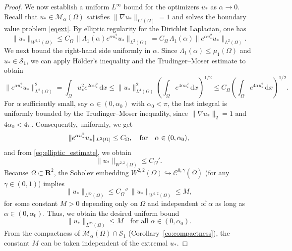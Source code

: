 \documentclass[reqno,11pt]{amsart}
\theoremstyle{definition}
\newcommand{\ud}{\,\mathrm{d}}
\begin{document}
\begin{proof}
We now establish a uniform $L^\infty$ bound for the optimizers $u_*$ as $\alpha\to0$.  
Recall that $u_{*}\in \mathcal{M}_\alpha(\Omega)$ satisfies $\|\nabla u_*\|_{L^2(\Omega)}=1$ and solves the boundary value problem
\eqref{eqext}.
By elliptic regularity for the Dirichlet Laplacian, one has
\begin{equation}\label{eq:elliptic_estimate}
\|u_*\|_{W^{2,2}(\Omega)} \le C_\Omega\,\|\Lambda_1(\alpha)e^{\alpha u_*^2}u_*\|_{L^2(\Omega)}
= C_\Omega\,\Lambda_1(\alpha)\|e^{\alpha u_*^2}u_*\|_{L^2(\Omega)}.
\end{equation}
We next bound the right-hand side uniformly in $\alpha$.  
Since $\Lambda_1(\alpha)\le\mu_1(\Omega)$ and $u_*\in\mathcal{S}_1$, we can apply Hölder’s inequality and the Trudinger--Moser estimate to obtain
\[
\|e^{\alpha u_*^2}u_*\|_{L^2(\Omega)}^2
=\int_\Omega u_*^2 e^{2\alpha u_*^2}\ud x
\le
\|u_*\|_{L^4(\Omega)}^2
\left(\int_\Omega e^{4\alpha u_*^2}\ud x\right)^{1/2}
\le
C_\Omega
\left(\int_\Omega e^{4\alpha u_*^2}\ud x\right)^{1/2}.
\]
For $\alpha$ sufficiently small, say $\alpha\in(0,\alpha_0)$ with $\alpha_0<\pi$, the last integral is uniformly bounded by the Trudinger--Moser inequality, since $\| \nabla u_* \|_2 = 1$ and $4\alpha_0<4\pi$.  
Consequently, uniformly, we get
\[
\|e^{\alpha u_*^2}u_*\|_{L^2(\Omega)}\le C_\Omega,
\quad
{\rm for } \quad \alpha\in(0,\alpha_0),
\]
and from \eqref{eq:elliptic_estimate}, we obtain
\[
\|u_*\|_{W^{2,2}(\Omega)} \le C_\Omega'.
\]
Because $\Omega\subset\mathbf{R}^2$, the Sobolev embedding $W^{2,2}(\Omega)\hookrightarrow \mathcal{C}^{0,\gamma}(\overline{\Omega})$ (for any $\gamma\in(0,1)$) implies
\[
\|u_*\|_{L^\infty(\Omega)} \le C_\Omega''\,\|u_*\|_{W^{2,2}(\Omega)} \le M,
\]
for some constant $M>0$ depending only on $\Omega$ and independent of $\alpha$ as long as $\alpha\in(0,\alpha_0)$.  
Thus, we obtain the desired uniform bound
\begin{equation}\label{eq:uinftybound}
\|u_*\|_{L^\infty(\Omega)}\le M
\quad\text{for all }\alpha\in(0,\alpha_0).
\end{equation}
From the compactness of $\mathcal{M}_\alpha(\Omega)\cap {\mathcal{S}}_1$ (Corollary~\ref{co:compactness}), the constant $M$ can be taken independent of the extremal $u_*$.


\end{proof}
\end{document}
